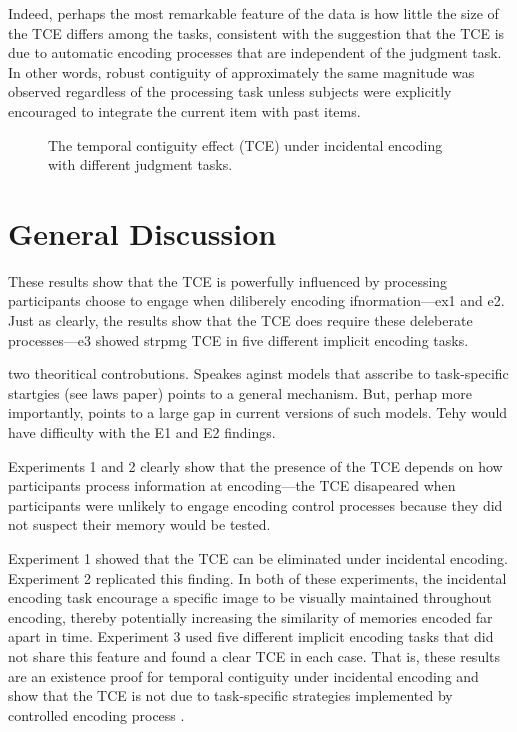\documentclass[jou,natbib]{apa6} %
\begin{document}
Indeed, perhaps the most remarkable feature of the data is how little the size of the TCE differs among the tasks, consistent with the suggestion that the TCE is due to automatic encoding processes that are independent of the judgment task. %
In other words, robust contiguity of approximately the same magnitude was observed regardless of the processing task unless subjects were explicitly encouraged to integrate the current item with past items.

\begin{figure*}%
\caption{The temporal contiguity effect (TCE) under incidental encoding with different judgment tasks. \paneltext}
\label{E3}
\end{figure*}

\section{General Discussion}
These results show that the TCE is powerfully influenced by processing participants choose to engage when diliberely encoding ifnormation---ex1 and e2. Just as clearly, the results show that the TCE does require these deleberate processes---e3 showed strpmg TCE in five different implicit encoding tasks.

two theoritical controbutions. Speakes aginst models that asscribe to task-specific startgies (see laws paper) points to a general mechanism. But, perhap more importantly, points to a large gap in current versions of such models. Tehy would have difficulty with the E1 and E2 findings.





Experiments 1 and 2 clearly show that the presence of the TCE depends on how participants process information at encoding---the TCE disapeared when participants were unlikely to engage encoding control processes because they did not suspect their memory would be tested.




Experiment 1 showed that the TCE can be eliminated under incidental encoding. Experiment 2 replicated this finding. In both of these experiments, the incidental encoding task encourage a specific image to be visually maintained throughout encoding, thereby potentially increasing the similarity of memories encoded far apart in time. Experiment 3 used five different implicit encoding tasks that did not share this feature and found a clear TCE in each case. That is, these results are an existence proof for temporal contiguity under incidental encoding and show that the TCE is not due to task-specific strategies implemented by controlled encoding process \citep[cf.][]{Hint16}.
\end{document}
